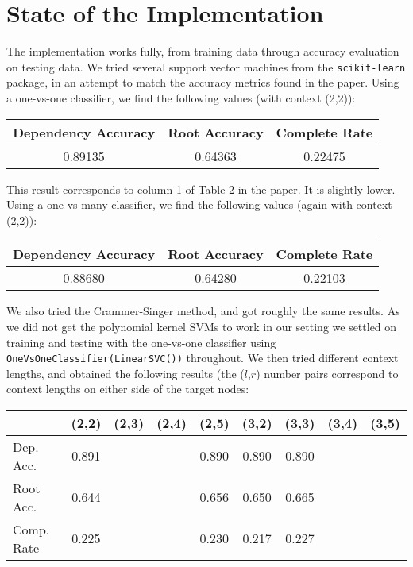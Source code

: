 \documentclass[12pt,fleqn]{article}
\begin{document}
    \section*{State of the Implementation}
    The implementation works fully, from training data through accuracy evaluation on testing data. We tried several support vector machines from the \texttt{scikit-learn} package, in an attempt to match the accuracy metrics found in the paper. Using a one-vs-one classifier, we find the following values (with context (2,2)):
    \begin{center}
        \begin{tabular}{|c|c|c|}
            \hline Dependency Accuracy & Root Accuracy & Complete Rate \\ \hline
            0.89135 & 0.64363 & 0.22475 \\ \hline
        \end{tabular}
    \end{center}
This result corresponds to column 1 of Table 2 in the paper. It is slightly lower.
    Using a one-vs-many classifier, we find the following values (again with context (2,2)):
    \begin{center}
        \begin{tabular}{|c|c|c|}
            \hline Dependency Accuracy & Root Accuracy & Complete Rate \\ \hline
            0.88680 & 0.64280 & 0.22103 \\ \hline
        \end{tabular}
    \end{center}
   
We also tried the Crammer-Singer method, and got roughly the same results. As we did not get the polynomial kernel SVMs to work in our setting we settled on training and testing with the one-vs-one classifier using \texttt{OneVsOneClassifier(LinearSVC())} throughout. We then tried different context lengths, and obtained the following results (the ($l$,$r$) number pairs correspond to context lengths on either side of the target nodes:
    \begin{center}
        \begin{tabular}{|l|cccc|cccc|}
            \cline{2-9} \multicolumn{1}{c|}{} & (2,2) & (2,3) & (2,4) & (2,5) & (3,2) & (3,3) & (3,4) & (3,5) \\ \hline
            Dep. Acc. & 0.891 &&& 0.890 & 0.890 & 0.890 && \\
            Root Acc. & 0.644 &&& 0.656 & 0.650 & 0.665 && \\
            Comp. Rate & 0.225 &&& 0.230 & 0.217 & 0.227 && \\ \hline
        \end{tabular}
    \end{center}
\end{document}
